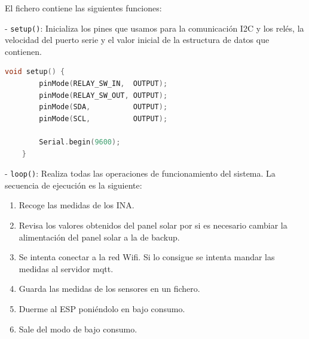 El fichero contiene las siguientes funciones:

- \texttt{setup()}: Inicializa los pines que usamos para la comunicación I2C y los relés, la velocidad del puerto serie y el valor inicial de la estructura de datos que contienen.

\begin{lstlisting}[captionpos=b, caption={Codigo de la funcion setup}, language=c++]
    void setup() {
        pinMode(RELAY_SW_IN,  OUTPUT);
        pinMode(RELAY_SW_OUT, OUTPUT);
        pinMode(SDA,          OUTPUT);
        pinMode(SCL,          OUTPUT);
    
        Serial.begin(9600);
    }    
\end{lstlisting}

- \texttt{loop()}: Realiza todas las operaciones de funcionamiento del sistema. La secuencia de ejecución es la siguiente:
\begin{enumerate}
    \item Recoge las medidas de los INA.
    \item Revisa los valores obtenidos del panel solar por si es necesario cambiar la alimentación del panel solar a la de backup.
    \item Se intenta conectar a la red Wifi. Si lo consigue se intenta mandar las medidas al servidor mqtt.
    \item Guarda las medidas de los sensores en un fichero.
    \item Duerme al ESP poniéndolo en bajo consumo.
    \item Sale del modo de bajo consumo.
\end{enumerate}

